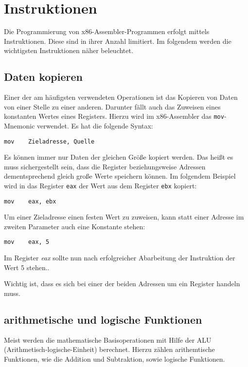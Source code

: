 \section{Instruktionen}

Die Programmierung von x86-Assembler-Programmen erfolgt mittels Instruktionen. Diese sind in ihrer Anzahl limitiert. Im folgendem werden die wichtigsten Instruktionen näher beleuchtet.

\subsection{Daten kopieren}
Einer der am häufigsten verwendeten Operationen ist das Kopieren von Daten von einer Stelle zu einer anderen.
Darunter fällt auch das Zuweisen eines konstanten Wertes eines Registers.
Hierzu wird im x86-Assembler das \texttt{mov}-Mnemonic verwendet. Es hat die folgende Syntax:

\begin{verbatim}mov    Zieladresse, Quelle\end{verbatim}

Es können immer nur Daten der gleichen Größe kopiert werden.
Das heißt es muss sichergestellt sein, dass die Register beziehungsweise Adressen dementsprechend gleich große Werte speichern können.
Im folgendem Beispiel wird in das Register \texttt{eax} der Wert aus dem Register \texttt{ebx} kopiert:

\begin{verbatim}mov    eax, ebx\end{verbatim}

Um einer Zieladresse einen festen Wert zu zuweisen, kann statt einer Adresse im zweiten Parameter auch eine Konstante stehen:

\begin{verbatim}mov    eax, 5\end{verbatim}

Im Register \textit{eax} sollte nun nach erfolgreicher Abarbeitung der Instruktion der Wert 5 stehen..

Wichtig ist, dass es sich bei einer der beiden Adressen um ein Register handeln muss.


\subsection{arithmetische und logische Funktionen}
Meist werden die mathematische Basisoperationen mit Hilfe der ALU (Arithmetisch-logische-Einheit) berechnet.
Hierzu zählen arithemtische Funktionen, wie die Addition und Subtraktion, sowie logische Funktionen.

